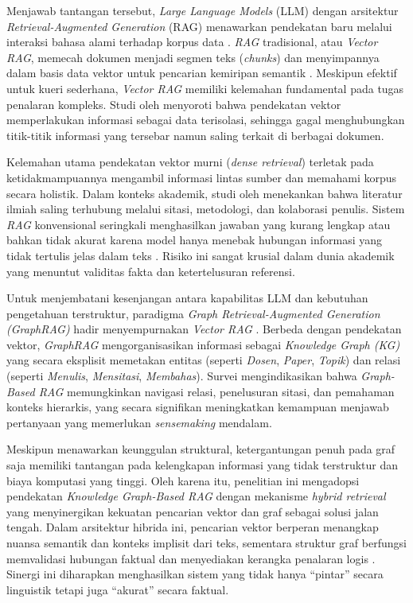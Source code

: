 Menjawab tantangan tersebut, \textit{Large Language Models} (LLM) dengan arsitektur \textit{Retrieval-Augmented Generation} (RAG) menawarkan pendekatan baru melalui interaksi bahasa alami terhadap korpus data \citep{lewis2021retrievalaugmentedgenerationknowledgeintensivenlp}. \textit{RAG} tradisional, atau \textit{Vector RAG}, memecah dokumen menjadi segmen teks (\textit{chunks}) dan menyimpannya dalam basis data vektor untuk pencarian kemiripan semantik \citep{gao2024retrievalaugmentedgenerationlargelanguage}. Meskipun efektif untuk kueri sederhana, \textit{Vector RAG} memiliki kelemahan fundamental pada tugas penalaran kompleks. Studi oleh \citet{han2025ragvsgraphragsystematic} menyoroti bahwa pendekatan vektor memperlakukan informasi sebagai data terisolasi, sehingga gagal menghubungkan titik-titik informasi yang tersebar namun saling terkait di berbagai dokumen.

Kelemahan utama pendekatan vektor murni (\textit{dense retrieval}) terletak pada ketidakmampuannya mengambil informasi lintas sumber dan memahami korpus secara holistik. Dalam konteks akademik, studi oleh \citet{10.1145/3155133.3155154} menekankan bahwa literatur ilmiah saling terhubung melalui sitasi, metodologi, dan kolaborasi penulis. Sistem \textit{RAG} konvensional seringkali menghasilkan jawaban yang kurang lengkap atau bahkan tidak akurat karena model hanya menebak hubungan informasi yang tidak tertulis jelas dalam teks \citep{wu2024medicalgraphragsafe}. Risiko ini sangat krusial dalam dunia akademik yang menuntut validitas fakta dan ketertelusuran referensi.

Untuk menjembatani kesenjangan antara kapabilitas LLM dan kebutuhan pengetahuan terstruktur, paradigma \textit{Graph Retrieval-Augmented Generation (GraphRAG)} hadir menyempurnakan \textit{Vector RAG} \citep{edge2025localglobalgraphrag}. Berbeda dengan pendekatan vektor, \textit{GraphRAG} mengorganisasikan informasi sebagai \textit{Knowledge Graph (KG)} yang secara eksplisit memetakan entitas (seperti \textit{Dosen}, \textit{Paper}, \textit{Topik}) dan relasi (seperti \textit{Menulis}, \textit{Mensitasi}, \textit{Membahas}). Survei \citet{peng2024graphretrievalaugmentedgenerationsurvey} mengindikasikan bahwa \textit{Graph-Based RAG} memungkinkan navigasi relasi, penelusuran sitasi, dan pemahaman konteks hierarkis, yang secara signifikan meningkatkan kemampuan menjawab pertanyaan yang memerlukan \textit{sensemaking} mendalam.

Meskipun menawarkan keunggulan struktural, ketergantungan penuh pada graf saja memiliki tantangan pada kelengkapan informasi yang tidak terstruktur dan biaya komputasi yang tinggi. Oleh karena itu, penelitian ini mengadopsi pendekatan \textit{Knowledge Graph-Based RAG} dengan mekanisme \textit{hybrid retrieval} yang menyinergikan kekuatan pencarian vektor dan graf sebagai solusi jalan tengah. Dalam arsitektur hibrida ini, pencarian vektor berperan menangkap nuansa semantik dan konteks implisit dari teks, sementara struktur graf berfungsi memvalidasi hubungan faktual dan menyediakan kerangka penalaran logis \citep{nagori2025opensourceagentichybridrag}. Sinergi ini diharapkan menghasilkan sistem yang tidak hanya ``pintar'' secara linguistik tetapi juga ``akurat'' secara faktual.

